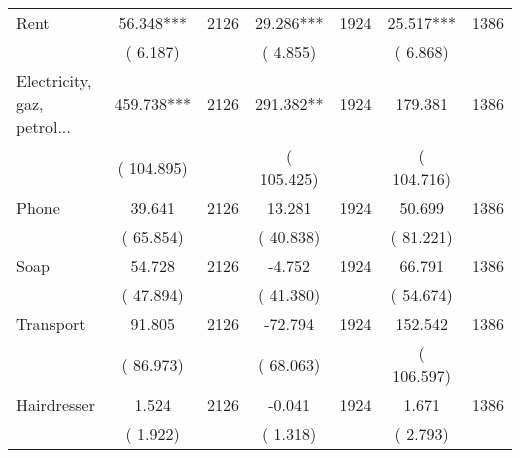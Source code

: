 \begin{tabular}{l*{6}{c}}
Rent        &             56.348***      &       2126       &             29.286***      &       1924       &             25.517***      &       1386       \\
                       &       (       6.187)            &                               &       (       4.855)            &                               &       (       6.868)            &                               \\
Electricity, gaz, petrol...        &            459.738***      &       2126       &            291.382**      &       1924       &            179.381      &       1386       \\
                       &       (     104.895)            &                               &       (     105.425)            &                               &       (     104.716)            &                               \\
Phone        &             39.641      &       2126       &             13.281      &       1924       &             50.699      &       1386       \\
                       &       (      65.854)            &                               &       (      40.838)            &                               &       (      81.221)            &                               \\
Soap        &             54.728      &       2126       &             -4.752      &       1924       &             66.791      &       1386       \\
                       &       (      47.894)            &                               &       (      41.380)            &                               &       (      54.674)            &                               \\
Transport        &             91.805      &       2126       &            -72.794      &       1924       &            152.542      &       1386       \\
                       &       (      86.973)            &                               &       (      68.063)            &                               &       (     106.597)            &                               \\
Hairdresser        &              1.524      &       2126       &             -0.041      &       1924       &              1.671      &       1386       \\
                       &       (       1.922)            &                               &       (       1.318)            &                               &       (       2.793)            &                               \\

\end{tabular}
